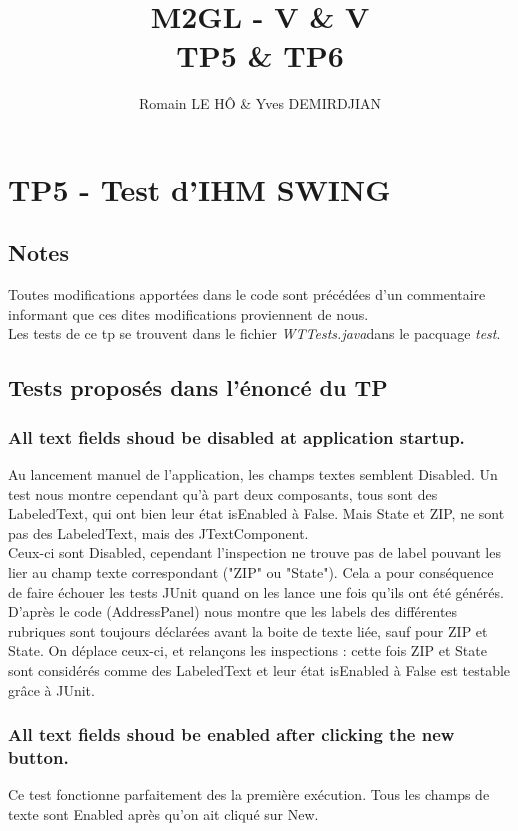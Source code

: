 \documentclass[a4paper,oneside,frenchb,12pt]{report}
\title{M2GL - V \& V\\TP5 \& TP6}
\author{Romain LE HÔ \& Yves DEMIRDJIAN}
\begin{document}
\maketitle

\chapter{TP5 - Test d'IHM SWING}

\section {Notes}
Toutes modifications apportées dans le code sont précédées d'un commentaire informant que ces dites modifications proviennent de nous.\\
Les tests de ce tp se trouvent dans le fichier \emph{WTTests.java}dans le pacquage \emph{test}.

\section{Tests proposés dans l'énoncé du TP}

\subsection{All text fields shoud be disabled at application startup.} 
Au lancement manuel de l'application, les champs textes semblent Disabled. 
Un test nous montre cependant qu'à part deux composants, tous sont des LabeledText, 
qui ont bien leur état isEnabled à False. Mais State et ZIP, ne sont pas des LabeledText, 
mais des JTextComponent.\\

Ceux-ci sont Disabled, cependant l'inspection ne trouve pas de label 
pouvant les lier au champ texte correspondant ("ZIP" ou "State"). 
Cela a pour conséquence de faire échouer les tests JUnit quand on les lance 
une fois qu'ils ont été générés.\\

D'après le code (AddressPanel) nous montre que les labels des différentes rubriques 
sont toujours déclarées avant la boite de texte liée, sauf pour ZIP et State. 
On déplace ceux-ci, et relançons les inspections : cette fois ZIP et State sont 
considérés comme des LabeledText et leur état isEnabled à False est testable grâce 
à JUnit.\\

\subsection{All text fields shoud be enabled after clicking the new button.}
Ce test fonctionne parfaitement des la première exécution. Tous les champs 
de texte sont Enabled après qu'on ait cliqué sur New.\\
\end{document}
